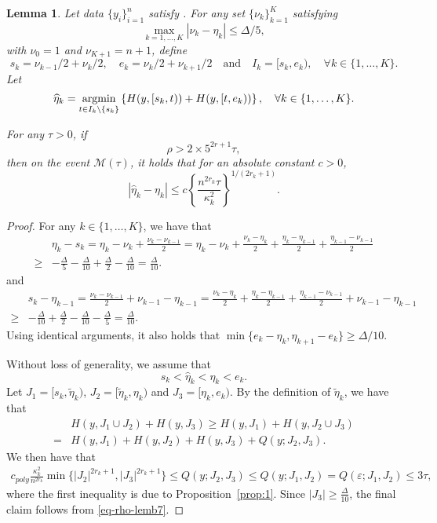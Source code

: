 \documentclass{article}
\newtheorem{lemma}[theorem]{Lemma}
\def\argmin{\mathop{\rm argmin}}
\begin{document}
\begin{lemma}\label{lem:refine}
Let data $\{y_i\}_{i = 1}^n$ satisfy .  For any set $\{\nu_k\}_{k = 1}^K$ satisfying
	\[
		\max_{k = 1, \ldots, K}|\nu_k - \eta_k| \leq \Delta/5,
	\]
	with $\nu_0 = 1$ and $\nu_{K+1} = n+1$, define
	\[
		s_k = \nu_{k-1}/2 + \nu_k/2, \quad e_k = \nu_k/2 + \nu_{k+1}/2 \quad \mbox{and} \quad I_k = [s_k, e_k), \quad \forall k \in \{1, \ldots, K\}.
	\]
	Let
	\[
		\widehat{\eta}_k = \argmin_{t \in I_k \setminus \{s_k\}} \left\{H(y, [s_k, t)) + H(y, [t, e_k))\right\}, \quad \forall k \in \{1, \ldots, K\}.
	\]
	
For any $\tau > 0$, if 
	\begin{equation}\label{eq-rho-lemb7}
		\rho > 2\times 5^{2r + 1} \tau, 		
	\end{equation}
	then on the event $\mathcal{M}(\tau)$, it holds that for an absolute constant $c > 0$,
	\[
		|\widehat{\eta}_k - \eta_k| \leq c \left\{\frac{n^{2r_k} \tau}{\kappa_k^2}\right\}^{1/(2r_k+1)}.
	\]
\end{lemma}

\begin{proof}
For any $k \in \{1, \ldots, K\}$, we have that
	\begin{align*}
		& \eta_k - s_k = \eta_k - \nu_k + \frac{\nu_k - \nu_{k - 1}}{2} = \eta_k - \nu_k +  \frac{\nu_k - \eta_{k}}{2} +  \frac{\eta_k - \eta_{k - 1}}{2} +  \frac{\eta_{k - 1} - \nu_{k - 1}}{2} \\
		\geq & -\frac{\Delta}{5} - \frac{\Delta}{10} + \frac{\Delta}{2} - \frac{\Delta}{10} = \frac{\Delta}{10}.
	\end{align*}
	and
	\begin{align*}
		& s_k - \eta_{k-1} =  \frac{\nu_k - \nu_{k - 1}}{2} + \nu_{k - 1} - \eta_{k - 1} = \frac{\nu_k - \eta_{k}}{2} + \frac{\eta_k - \eta_{k - 1}}{2} + \frac{\eta_{k - 1} - \nu_{k - 1}}{2} + \nu_{k - 1} - \eta_{k - 1} \\
		\geq & -\frac{\Delta}{10} + \frac{\Delta}{2} - \frac{\Delta}{10} - \frac{\Delta}{5} = \frac{\Delta}{10}.
	\end{align*}
	Using identical arguments, it also holds that $\min\{e_k - \eta_k, \eta_{k + 1} - e_k\} \geq \Delta/10$.  
	
Without loss of generality, we assume that
	\[
		s_k < \widehat{\eta}_k < \eta_k < e_k.
	\]
	Let $J_1 = [s_k, \widetilde{\eta}_k)$, $J_2 = [\widetilde{\eta}_k, \eta_k)$ and $J_3 = [\eta_k, e_k)$.  By the definition of $\widetilde{\eta}_k$, we have that
	\begin{align*}
		& H(y, J_1 \cup J_2) + H(y, J_3) \geq H(y, J_1) + H(y, J_2 \cup J_3) \\
		= & H(y, J_1) + H(y, J_2) + H(y, J_3) + Q(y; J_2, J_3).
	\end{align*} 
	We then have that
	\begin{align*}
	c_{poly} \frac{\kappa_{k}^2}{n^{2r_k}} \min\{|J_2|^{2r_k + 1}, |J_3|^{2r_k + 1}\} \leq Q(y;J_2,J_3) \leq Q(y; J_1, J_2) = Q(\varepsilon; J_1, J_2)\leq 3 \tau,
	\end{align*}
	where the first inequality is due to Proposition~\ref{prop:1}.  Since $|J_3| \geq \frac{\Delta}{10}$, the final claim follows from \eqref{eq-rho-lemb7}.
\end{proof}
\end{document}
